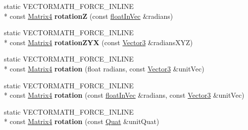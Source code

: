 \begin{DoxyCompactItemize}
\item 
\hypertarget{class_vectormath_1_1_aos_1_1_matrix4_ad6f68ee636dfdfac03fd0be824ec3052}{static V\+E\+C\+T\+O\+R\+M\+A\+T\+H\+\_\+\+F\+O\+R\+C\+E\+\_\+\+I\+N\+L\+I\+N\+E \\*
const \hyperlink{class_vectormath_1_1_aos_1_1_matrix4}{Matrix4} {\bfseries rotation\+Z} (const \hyperlink{class_vectormath_1_1float_in_vec}{float\+In\+Vec} \&radians)}\label{class_vectormath_1_1_aos_1_1_matrix4_ad6f68ee636dfdfac03fd0be824ec3052}

\item 
\hypertarget{class_vectormath_1_1_aos_1_1_matrix4_a7fa9c305f8fdb0bd26bf536cbdd5040f}{static V\+E\+C\+T\+O\+R\+M\+A\+T\+H\+\_\+\+F\+O\+R\+C\+E\+\_\+\+I\+N\+L\+I\+N\+E \\*
const \hyperlink{class_vectormath_1_1_aos_1_1_matrix4}{Matrix4} {\bfseries rotation\+Z\+Y\+X} (const \hyperlink{class_vectormath_1_1_aos_1_1_vector3}{Vector3} \&radians\+X\+Y\+Z)}\label{class_vectormath_1_1_aos_1_1_matrix4_a7fa9c305f8fdb0bd26bf536cbdd5040f}

\item 
\hypertarget{class_vectormath_1_1_aos_1_1_matrix4_a9ca83ed9445fff0adf8c87ed8453ce58}{static V\+E\+C\+T\+O\+R\+M\+A\+T\+H\+\_\+\+F\+O\+R\+C\+E\+\_\+\+I\+N\+L\+I\+N\+E \\*
const \hyperlink{class_vectormath_1_1_aos_1_1_matrix4}{Matrix4} {\bfseries rotation} (float radians, const \hyperlink{class_vectormath_1_1_aos_1_1_vector3}{Vector3} \&unit\+Vec)}\label{class_vectormath_1_1_aos_1_1_matrix4_a9ca83ed9445fff0adf8c87ed8453ce58}

\item 
\hypertarget{class_vectormath_1_1_aos_1_1_matrix4_aa675b03510d2410b850cf2db30d4084f}{static V\+E\+C\+T\+O\+R\+M\+A\+T\+H\+\_\+\+F\+O\+R\+C\+E\+\_\+\+I\+N\+L\+I\+N\+E \\*
const \hyperlink{class_vectormath_1_1_aos_1_1_matrix4}{Matrix4} {\bfseries rotation} (const \hyperlink{class_vectormath_1_1float_in_vec}{float\+In\+Vec} \&radians, const \hyperlink{class_vectormath_1_1_aos_1_1_vector3}{Vector3} \&unit\+Vec)}\label{class_vectormath_1_1_aos_1_1_matrix4_aa675b03510d2410b850cf2db30d4084f}

\item 
\hypertarget{class_vectormath_1_1_aos_1_1_matrix4_ae72b79063c70eaa00e504966a2b56f1f}{static V\+E\+C\+T\+O\+R\+M\+A\+T\+H\+\_\+\+F\+O\+R\+C\+E\+\_\+\+I\+N\+L\+I\+N\+E \\*
const \hyperlink{class_vectormath_1_1_aos_1_1_matrix4}{Matrix4} {\bfseries rotation} (const \hyperlink{class_vectormath_1_1_aos_1_1_quat}{Quat} \&unit\+Quat)}\label{class_vectormath_1_1_aos_1_1_matrix4_ae72b79063c70eaa00e504966a2b56f1f}


\end{DoxyCompactItemize}
